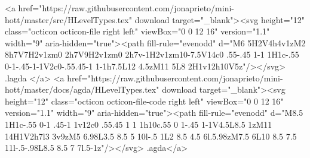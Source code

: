 {        <a href="https://raw.githubusercontent.com/jonaprieto/mini-hott/master/src/HLevelTypes.tex" download target="_blank"><svg height="12" class="octicon octicon-file right left" viewBox="0 0 12 16" version="1.1" width="9" aria-hidden="true"><path fill-rule="evenodd" d="M6 5H2V4h4v1zM2 8h7V7H2v1zm0 2h7V9H2v1zm0 2h7v-1H2v1zm10-7.5V14c0 .55-.45 1-1 1H1c-.55 0-1-.45-1-1V2c0-.55.45-1 1-1h7.5L12 4.5zM11 5L8 2H1v12h10V5z"/></svg> .lagda </a>
        <a href="https://raw.githubusercontent.com/jonaprieto/mini-hott/master/docs/agda/HLevelTypes.tex" download target="_blank"><svg height="12" class="octicon octicon-file-code right left" viewBox="0 0 12 16" version="1.1" width="9" aria-hidden="true"><path fill-rule="evenodd" d="M8.5 1H1c-.55 0-1 .45-1 1v12c0 .55.45 1 1 1h10c.55 0 1-.45 1-1V4.5L8.5 1zM11 14H1V2h7l3 3v9zM5 6.98L3.5 8.5 5 10l-.5 1L2 8.5 4.5 6l.5.98zM7.5 6L10 8.5 7.5 11l-.5-.98L8.5 8.5 7 7l.5-1z"/></svg> .agda</a>
      
}
